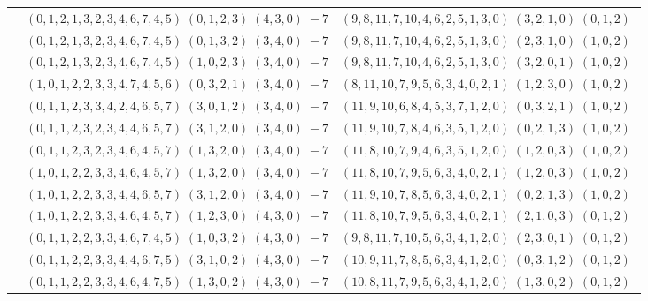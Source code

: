 \documentclass[11pt]{article}
\begin{document}
\begin{longtable}[l]{|c|c|c|}
 \cline{2-3} 
 & $(0 ,1 ,2 ,1 ,3 ,2 ,3 ,4 ,6 ,7 ,4 ,5) \;(0 ,1 ,2 ,3) \;(4 ,3 ,0) \;-7$ & $(9 ,8 ,11 ,7 ,10 ,4 ,6 ,2 ,5 ,1 ,3 ,0) \;(3 ,2 ,1 ,0) \;(0 ,1 ,2) \;$\\ 
 \cline{2-3} 
 & $(0 ,1 ,2 ,1 ,3 ,2 ,3 ,4 ,6 ,7 ,4 ,5) \;(0 ,1 ,3 ,2) \;(3 ,4 ,0) \;-7$ & $(9 ,8 ,11 ,7 ,10 ,4 ,6 ,2 ,5 ,1 ,3 ,0) \;(2 ,3 ,1 ,0) \;(1 ,0 ,2) \;$\\ 
 \cline{2-3} 
 & $(0 ,1 ,2 ,1 ,3 ,2 ,3 ,4 ,6 ,7 ,4 ,5) \;(1 ,0 ,2 ,3) \;(3 ,4 ,0) \;-7$ & $(9 ,8 ,11 ,7 ,10 ,4 ,6 ,2 ,5 ,1 ,3 ,0) \;(3 ,2 ,0 ,1) \;(1 ,0 ,2) \;$\\ 
 \cline{2-3} 
 & $(1 ,0 ,1 ,2 ,2 ,3 ,3 ,4 ,7 ,4 ,5 ,6) \;(0 ,3 ,2 ,1) \;(3 ,4 ,0) \;-7$ & $(8 ,11 ,10 ,7 ,9 ,5 ,6 ,3 ,4 ,0 ,2 ,1) \;(1 ,2 ,3 ,0) \;(1 ,0 ,2) \;$\\ 
 \cline{2-3} 
 & $(0 ,1 ,1 ,2 ,3 ,3 ,4 ,2 ,4 ,6 ,5 ,7) \;(3 ,0 ,1 ,2) \;(3 ,4 ,0) \;-7$ & $(11 ,9 ,10 ,6 ,8 ,4 ,5 ,3 ,7 ,1 ,2 ,0) \;(0 ,3 ,2 ,1) \;(1 ,0 ,2) \;$\\ 
 \cline{2-3} 
 & $(0 ,1 ,1 ,2 ,3 ,2 ,3 ,4 ,4 ,6 ,5 ,7) \;(3 ,1 ,2 ,0) \;(3 ,4 ,0) \;-7$ & $(11 ,9 ,10 ,7 ,8 ,4 ,6 ,3 ,5 ,1 ,2 ,0) \;(0 ,2 ,1 ,3) \;(1 ,0 ,2) \;$\\ 
 \cline{2-3} 
 & $(0 ,1 ,1 ,2 ,3 ,2 ,3 ,4 ,6 ,4 ,5 ,7) \;(1 ,3 ,2 ,0) \;(3 ,4 ,0) \;-7$ & $(11 ,8 ,10 ,7 ,9 ,4 ,6 ,3 ,5 ,1 ,2 ,0) \;(1 ,2 ,0 ,3) \;(1 ,0 ,2) \;$\\ 
 \cline{2-3} 
 & $(1 ,0 ,1 ,2 ,2 ,3 ,3 ,4 ,6 ,4 ,5 ,7) \;(1 ,3 ,2 ,0) \;(3 ,4 ,0) \;-7$ & $(11 ,8 ,10 ,7 ,9 ,5 ,6 ,3 ,4 ,0 ,2 ,1) \;(1 ,2 ,0 ,3) \;(1 ,0 ,2) \;$\\ 
 \cline{2-3} 
 & $(1 ,0 ,1 ,2 ,2 ,3 ,3 ,4 ,4 ,6 ,5 ,7) \;(3 ,1 ,2 ,0) \;(3 ,4 ,0) \;-7$ & $(11 ,9 ,10 ,7 ,8 ,5 ,6 ,3 ,4 ,0 ,2 ,1) \;(0 ,2 ,1 ,3) \;(1 ,0 ,2) \;$\\ 
 \cline{2-3} 
 & $(1 ,0 ,1 ,2 ,2 ,3 ,3 ,4 ,6 ,4 ,5 ,7) \;(1 ,2 ,3 ,0) \;(4 ,3 ,0) \;-7$ & $(11 ,8 ,10 ,7 ,9 ,5 ,6 ,3 ,4 ,0 ,2 ,1) \;(2 ,1 ,0 ,3) \;(0 ,1 ,2) \;$\\ 
 \cline{2-3} 
 & $(0 ,1 ,1 ,2 ,2 ,3 ,3 ,4 ,6 ,7 ,4 ,5) \;(1 ,0 ,3 ,2) \;(4 ,3 ,0) \;-7$ & $(9 ,8 ,11 ,7 ,10 ,5 ,6 ,3 ,4 ,1 ,2 ,0) \;(2 ,3 ,0 ,1) \;(0 ,1 ,2) \;$\\ 
 \cline{2-3} 
 & $(0 ,1 ,1 ,2 ,2 ,3 ,3 ,4 ,4 ,6 ,7 ,5) \;(3 ,1 ,0 ,2) \;(4 ,3 ,0) \;-7$ & $(10 ,9 ,11 ,7 ,8 ,5 ,6 ,3 ,4 ,1 ,2 ,0) \;(0 ,3 ,1 ,2) \;(0 ,1 ,2) \;$\\ 
 \cline{2-3} 
 & $(0 ,1 ,1 ,2 ,2 ,3 ,3 ,4 ,6 ,4 ,7 ,5) \;(1 ,3 ,0 ,2) \;(4 ,3 ,0) \;-7$ & $(10 ,8 ,11 ,7 ,9 ,5 ,6 ,3 ,4 ,1 ,2 ,0) \;(1 ,3 ,0 ,2) \;(0 ,1 ,2) \;$\\ 

\end{longtable}
\end{document}
